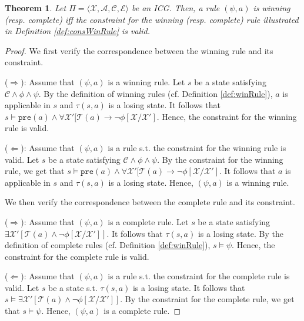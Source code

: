 \documentclass[review]{elsarticle}
\newcommand{\tuple}[1]{\langle {#1} \rangle}
\newcommand{\statevar}{\mathcal{X}}
\newcommand{\act}{\mathcal{A}}
\newcommand{\trans}{\mathcal{T}}
\newcommand{\constraint}{\mathcal{C}}
\newcommand{\estate}{\mathcal{E}}
\newcommand{\pre}{\mathtt{pre}}
\newcommand{\suc}{\tau}
\newtheorem{theorem}{Theorem}
\begin{document}
\begin{theorem} \label{thm:consWinRule} 
	Let $\Pi = \tuple{\statevar, \act, \constraint, \estate}$ be an ICG.
	Then, a rule $(\psi, a)$ is winning (resp. complete) iff the constraint for the winning (resp. complete) rule illustrated in Definition \ref{def:consWinRule} is valid.
\end{theorem}

\begin{proof}
	We first verify the correspondence between the winning rule and its constraint. %
	
	($\Rightarrow$): Assume that $(\psi, a)$ is a winning rule.
	Let $s$ be a state satisfying $\constraint \land \phi \land \psi$.
	By the definition of winning rules (cf. Definition \ref{def:winRule}), $a$ is applicable in $s$ and $\suc(s, a)$ is a losing state.
	It follows that $s \models \pre(a) \land \forall \statevar' [\trans(a) \rightarrow \neg \phi[\statevar/\statevar']$.
	Hence, the constraint for the winning rule is valid.
	
	($\Leftarrow$): Assume that $(\psi, a)$ is a rule s.t. the constraint for the winning rule is valid.
	Let $s$ be a state satisfying $\constraint \land \phi \land \psi$.
	By the constraint for the winning rule, we get that $s \models \pre(a) \land \forall \statevar' [\trans(a) \rightarrow \neg \phi[\statevar/\statevar']$.
	It follows that $a$ is applicable in $s$ and $\suc(s, a)$ is a losing state.
	Hence, $(\psi, a)$ is a winning rule.
	
	We then verify the correspondence between the complete rule and its constraint.
	
	($\Rightarrow$): Assume that $(\psi, a)$ is a complete rule.
	Let $s$ be a state satisfying $\exists \statevar' [\trans(a) \land \neg \phi[\statevar/\statevar']]$.
	It follows that $\suc(s, a)$ is a losing state.	
	By the definition of complete rules (cf. Definition \ref{def:winRule}), $s \models \psi$.
	Hence, the constraint for the complete rule is valid.
	
	($\Leftarrow$): Assume that $(\psi, a)$ is a rule s.t. the constraint for the complete rule is valid.
	Let $s$ be a state s.t. $\suc(s, a)$ is a losing state.
	It follows that $s \models \exists \statevar' [\trans(a) \land \neg \phi[\statevar/\statevar']]$.
	By the constraint for the complete rule, we get that $s \models \psi$.
	Hence,  $(\psi, a)$ is a complete rule.	
\end{proof}
\end{document}
